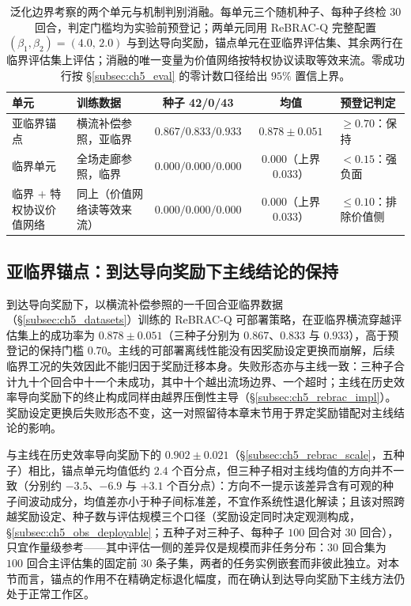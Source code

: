 \begin{table}[t]
\centering
\caption{泛化边界考察的两个单元与机制判别消融。每单元三个随机种子、每种子终检 $30$ 回合，判定门槛均为实验前预登记；两单元同用 ReBRAC-Q 完整配置 $(\beta_1,\beta_2)=(4.0,\,2.0)$ 与到达导向奖励，锚点单元在亚临界评估集、其余两行在临界评估集上评估；消融的唯一变量为价值网络按特权协议读取等效来流。零成功行按 \S\ref{subsec:ch5_eval} 的零计数口径给出 $95\%$ 置信上界。}
\label{tab:ch5_boundary_cells}
\footnotesize
\setlength{\tabcolsep}{3pt}
\begin{tabular}{l l c c l}
\toprule
\textbf{单元} & \textbf{训练数据} & \textbf{种子 42/0/43} & \textbf{均值} & \textbf{预登记判定} \\
\midrule
亚临界锚点 & 横流补偿参照，亚临界 & $0.867/0.833/0.933$ & $0.878 \pm 0.051$ & $\ge 0.70$：保持 \\
临界单元 & 全场走廊参照，临界 & $0.000/0.000/0.000$ & $0.000$（上界 $0.033$） & $< 0.15$：强负面 \\
临界 $+$ 特权协议价值网络 & 同上（价值网络读等效来流） & $0.000/0.000/0.000$ & $0.000$（上界 $0.033$） & $\le 0.10$：排除价值侧 \\
\bottomrule
\end{tabular}
\end{table}

\subsection{亚临界锚点：到达导向奖励下主线结论的保持}\label{subsec:ch5_boundary_anchor}

到达导向奖励下，以横流补偿参照的一千回合亚临界数据（\S\ref{subsec:ch5_datasets}）训练的 ReBRAC-Q 可部署策略，在亚临界横流穿越评估集上的成功率为 $0.878 \pm 0.051$（三种子分别为 $0.867$、$0.833$ 与 $0.933$），高于预登记的保持门槛 $0.70$。主线的可部署离线性能没有因奖励设定更换而崩解，后续临界工况的失效因此不能归因于奖励迁移本身。失败形态亦与主线一致：三种子合计九十个回合中十一个未成功，其中十个越出流场边界、一个超时；主线在历史效率导向奖励下的终止构成同样由越界压倒性主导（\S\ref{subsec:ch5_rebrac_impl}）。奖励设定更换后失败形态不变，这一对照留待本章末节用于界定奖励错配对主线结论的影响。

与主线在历史效率导向奖励下的 $0.902 \pm 0.021$（\S\ref{subsec:ch5_rebrac_scale}，五种子）相比，锚点单元均值低约 $2.4$ 个百分点，但三种子相对主线均值的方向并不一致（分别约 $-3.5$、$-6.9$ 与 $+3.1$ 个百分点）：方向不一提示该差异含有可观的种子间波动成分，均值差亦小于种子间标准差，不宜作系统性退化解读；且该对照跨越奖励设定、种子数与评估规模三个口径（奖励设定同时决定观测构成，\S\ref{subsec:ch5_obs_deployable}；五种子对三种子、每种子 $100$ 回合对 $30$ 回合），只宜作量级参考——其中评估一侧的差异仅是规模而非任务分布：$30$ 回合集为 $100$ 回合主评估集的固定前 $30$ 条子集，两者的任务实例嵌套而非彼此独立。对本节而言，锚点的作用不在精确定标退化幅度，而在确认到达导向奖励下主线方法仍处于正常工作区。

